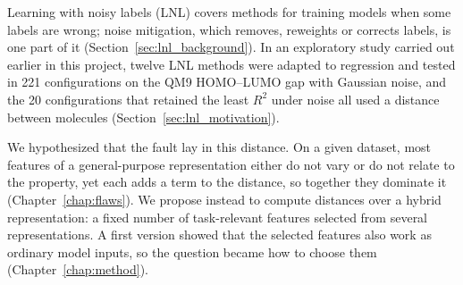 Learning with noisy labels (LNL) covers methods for training models when some labels are wrong; noise mitigation, which removes, reweights or corrects labels, is one part of it (Section~\ref{sec:lnl_background}). In an exploratory study carried out earlier in this project, twelve LNL methods were adapted to regression and tested in 221 configurations on the QM9 HOMO--LUMO gap with Gaussian noise, and the 20 configurations that retained the least $R^2$ under noise all used a distance between molecules (Section~\ref{sec:lnl_motivation}).
%

We hypothesized that the fault lay in this distance. On a given dataset, most features of a general-purpose representation either do not vary or do not relate to the property, yet each adds a term to the distance, so together they dominate it (Chapter~\ref{chap:flaws}). We propose instead to compute distances over a hybrid representation: a fixed number of task-relevant features selected from several representations. A first version showed that the selected features also work as ordinary model inputs, so the question became how to choose them (Chapter~\ref{chap:method}).

